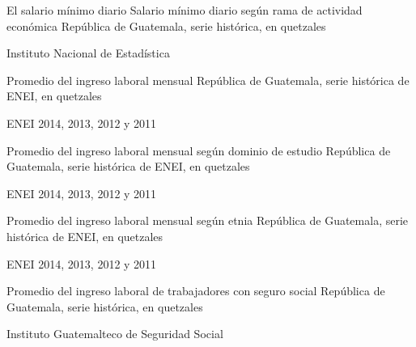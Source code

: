 
{%
El salario mínimo diario  }%
{%
 Salario mínimo diario según rama de actividad económica} %
{%
 República de Guatemala, serie histórica, en quetzales } %
{%
 \begin{tikzpicture}[x=1pt,y=1pt]    \end{tikzpicture}}%
{%
 Instituto Nacional de Estadística} %



%
{%
}%
{%
	Promedio del ingreso laboral mensual} %
{%
	República de Guatemala, serie histórica de ENEI, en quetzales } %
{%
	\begin{tikzpicture}[x=1pt,y=1pt]    \end{tikzpicture}}%
{%
	ENEI 2014, 2013, 2012 y 2011} %



%
{%
}%
{%
	Promedio del ingreso laboral mensual según dominio de estudio} %
{%
	República de Guatemala, serie histórica de ENEI, en quetzales } %
{%
	\begin{tikzpicture}[x=1pt,y=1pt]    \end{tikzpicture}}%
{%
	ENEI 2014, 2013, 2012 y 2011} %


%
{%
}%
{%
	Promedio del ingreso laboral mensual según etnia} %
{%
	República de Guatemala, serie histórica de ENEI, en quetzales } %
{%
	\begin{tikzpicture}[x=1pt,y=1pt]    \end{tikzpicture}}%
{%
	ENEI 2014, 2013, 2012 y 2011} %



%
{%
}%
{%
	Promedio del ingreso laboral de trabajadores con seguro social } %
{%
	República de Guatemala, serie histórica, en quetzales } %
{%
	\begin{tikzpicture}[x=1pt,y=1pt]    \end{tikzpicture}}%
{%
	Instituto Guatemalteco de Seguridad Social} %


